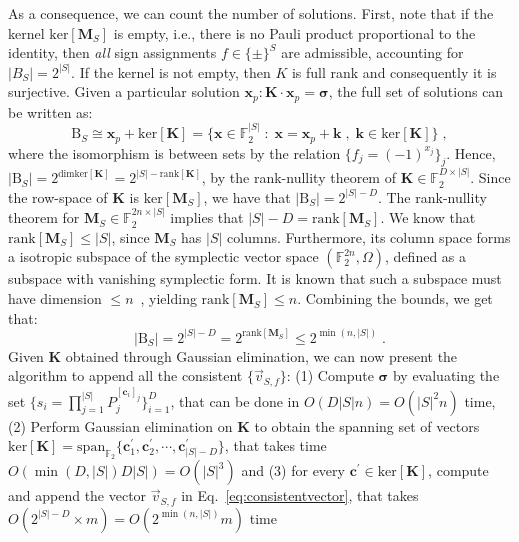 \documentclass[10pt,aps,pra,twocolumn,floatfix,nofootinbib,superscriptaddress,longbibliography]{revtex4-2}
\newcommand{\1}{\mathbbm{1}}
\begin{document}
    As a consequence, we can count the number of solutions. First, note that if the kernel $\mathrm{ker}[\mathbf M_S]$ is empty, i.e., there is no Pauli product proportional to the identity, then \emph{all} sign assignments $f\in\{\pm\}^S$ are admissible, accounting for $|B_S|=2^{|S|}$. If the kernel is not empty, then $K$ is full rank and consequently it is surjective. Given a particular solution $\mathbf x_p: \mathbf K \cdot\mathbf x_p=\boldsymbol{\sigma}$, the full set of solutions can be written as:
    \begin{equation}
        \mathrm B_S  \cong \mathbf x_p + \mathrm{ker}[\mathbf K] = \{\mathbf x \in \mathbb F_2^{|S|}\;:\; \mathbf x =\mathbf x_p+\mathbf k\;,\;\mathbf k \in \mathrm{ker}[\mathbf K]\}\;,
    \end{equation}
    where the isomorphism is between sets by the relation $\{f_j = (-1)^{x_j}\}_j$. Hence, $|\mathrm B_S| =2^{\mathrm{dim}\mathrm{ker}[\mathbf K]} = 2^{|S|-\mathrm{rank}[\mathbf K]}$, by the rank-nullity theorem of $\mathbf K \in \mathbb F_2^{D \times |S|}$. Since the row-space of $\mathbf K$ is $\mathrm{ker}[\mathbf M_S]$, we have that $|\mathrm B_S| = 2^{|S|-D}$. The rank-nullity theorem for $\mathbf M_S \in \mathbb F_2^{2n \times |S|}$ implies that $|S|-D=\mathrm{rank}[\mathbf M_S]$. We know that $\mathrm{rank}[\mathbf M_S] \leq |S|$, since $\mathbf M_S$ has $|S|$ columns. Furthermore, its column space forms a isotropic subspace of the symplectic vector space $(\mathbb F_2^{2n}, \Omega)$, defined as a subspace with vanishing symplectic form. It is known that such a subspace must have dimension $\leq n$~\cite{gottesman1997stabilizer}, yielding $\mathrm{rank}[\mathbf M_S] \leq n$. Combining the bounds, we get that:
    \begin{equation}
        |\mathrm B_S| =2^{|S|-D} =2^{\mathrm{rank}[\mathbf M_S]} \leq 2^{\min(n, |S|)}\;.
    \end{equation}
    Given $\mathbf K$ obtained through Gaussian elimination, we can now present the algorithm to append all the consistent $\{\vec{v}_{S,f}\}$: (1) Compute $\boldsymbol{\sigma}$ by evaluating the set $\{s_i = \prod_{j=1}^{|S|} P_j^{[\mathbf c_i]_j}\}_{i=1}^{D}$, that can be done in $O(D|S|n)  = O(|S|^2 n)$ time, (2) Perform Gaussian elimination on $\mathbf K$ to obtain the spanning set of vectors $\mathrm{ker}[\mathbf K] = \mathrm{span}_{\mathbb F_2} \{\mathbf c^\prime_1, \mathbf c^\prime_2, \cdots, \mathbf c^\prime_{|S|-D}\}$, that takes time $O(\min(D, |S|) D|S|) = O(|S|^3)$ and (3) for every $\mathbf c^\prime \in \mathrm{ker}[\mathbf K]$, compute and append the vector $\vec v_{S,f}$ in Eq.~\eqref{eq:consistentvector}, that takes $O(2^{|S|-D}\times m) = O(2^{\min(n,|S|)} m)$ time
\end{document}
